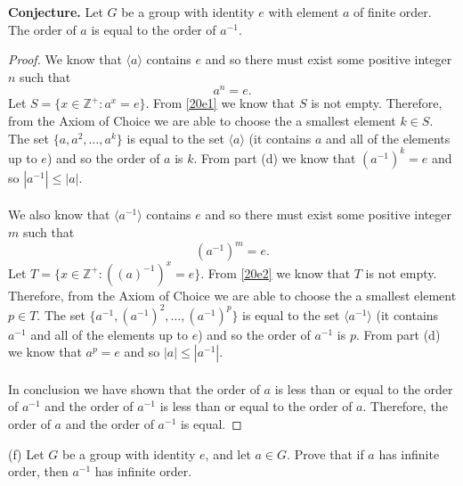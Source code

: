 \documentclass[11pt,a4paper]{article}
\begin{document}
{\bf Conjecture.}  Let $G$ be a group with identity $e$ with element $a$ of finite order. The order of $a$ is equal to the order of $a^{-1}$.
\begin{proof}
We know that $\langle a \rangle$ contains $e$ and so there must exist some positive integer $n$ such that
\begin{equation}\label{20e1}
a^n = e.
\end{equation}
Let $S=\{x\in\mathbb{Z}^+:a^x=e\}$. From \eqref{20e1} we know that $S$ is not empty. Therefore, from the Axiom of Choice we are able to choose the a smallest element $k\in S$. The set $\{a,a^2,\ldots,a^k\}$ is equal to the set $\langle a \rangle$ (it contains $a$ and all of the elements up to $e$) and so the order of $a$ is $k$. From part (d) we know that $(a^{-1})^k=e$ and so $|a^{-1}|\leq |a|$.\\
~\\
We also know that $\langle a^{-1} \rangle$ contains $e$ and so there must exist some positive integer $m$ such that
\begin{equation}\label{20e2}
(a^{-1})^m = e.
\end{equation}
Let $T=\{x\in\mathbb{Z}^+:((a)^{-1})^x=e\}$. From \eqref{20e2} we know that $T$ is not empty. Therefore, from the Axiom of Choice we are able to choose the a smallest element $p\in T$. The set $\{a^{-1},(a^{-1})^2,\ldots,(a^{-1})^p\}$ is equal to the set $\langle a^{-1} \rangle$ (it contains $a^{-1}$ and all of the elements up to $e$) and so the order of $a^{-1}$ is $p$. From part (d) we know that $a^p=e$ and so $|a|\leq |a^{-1}|$.\\
~\\
In conclusion we have shown that the order of $a$ is less than or equal to the order of $a^{-1}$ and the order of $a^{-1}$ is less than or equal to the order of $a$. Therefore, the order of $a$ and the order of $a^{-1}$ is equal.
\end{proof}

(f) Let $G$ be a group with identity $e$, and let $a \in G$. Prove that if $a$ has infinite
order, then $a^{-1}$ has infinite order.
\end{document}
